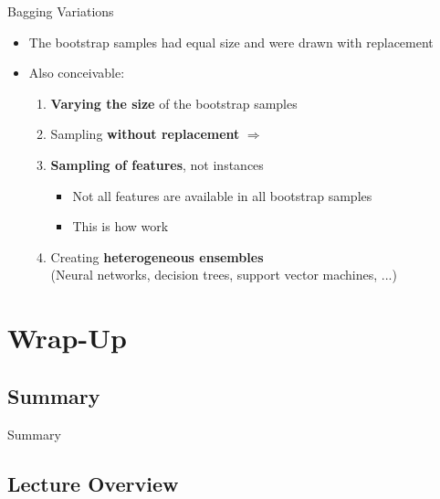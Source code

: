 \begin{frame}{Bagging Variations}{}
	\begin{itemize}
		\item The bootstrap samples had equal size and were drawn with replacement
		\item Also conceivable:
		\begin{enumerate}
			\item \textbf{Varying the size} of the bootstrap samples
			\item Sampling \textbf{without replacement} $\Rightarrow$ 
			\item \textbf{Sampling of features}, not instances
			\begin{itemize}
				\item Not all features are available in all bootstrap samples
				\item This is how  work
			\end{itemize}
			\item Creating \textbf{heterogeneous ensembles} \\
				(Neural networks, decision trees, support vector machines, ...)
		\end{enumerate}
	\end{itemize}
\end{frame}


\section{Wrap-Up}

\subsection{Summary}

\begin{frame}{Summary}{}

\end{frame}


\subsection{Lecture Overview}

